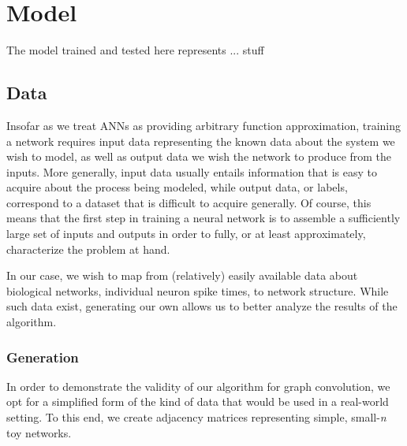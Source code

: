 \graphicspath{ {resources/} }
\chapter{Model}
\label{model}
The model trained and tested here represents ... stuff

\section{Data}
\label{sec:data}
Insofar as we treat ANNs as providing arbitrary function approximation, training
a network requires input data representing the known data about the system we
wish to model, as well as output data we wish the network to produce from the
inputs. More generally, input data usually entails information that is easy to 
acquire about the process being modeled, while output data, or labels, 
correspond to a dataset that is difficult to acquire generally. Of course, this 
means that the first step in training a neural network is to assemble a 
sufficiently large set of inputs and outputs in order to fully, or at least 
approximately, characterize the problem at hand.

In our case, we wish to map from (relatively) easily available data about 
biological networks, individual neuron spike times, to network structure. While 
such data exist, generating our own allows us to better analyze the results of 
the algorithm.


\subsection{Generation}
\label{subsec:generation}
In order to demonstrate the validity of our algorithm for graph convolution, we 
opt for a simplified form of the kind of data that would be used in a real-world 
setting.  To this end, we create adjacency matrices representing simple, 
small-\textit{n} toy networks.

